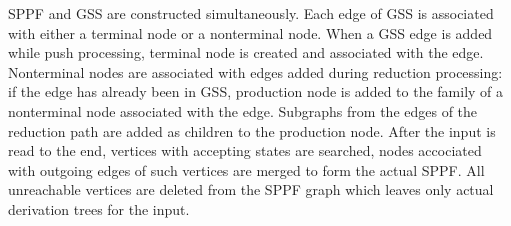 SPPF and GSS are constructed simultaneously. Each edge of GSS is associated with either 
a terminal node or a nonterminal node. When a GSS edge is added while push processing, 
terminal node is created and associated with the edge. Nonterminal nodes are associated
with edges added during reduction processing: if the edge has already been in GSS, 
production node is added to the family of a nonterminal node associated with the edge.
Subgraphs from the edges of the reduction path are added as children to the production
node. After the input is read to the end, vertices with accepting states are searched,
nodes accociated with outgoing edges of such vertices are merged to form the actual
SPPF. All unreachable vertices are deleted from the SPPF graph which leaves only 
actual derivation trees for the input.
